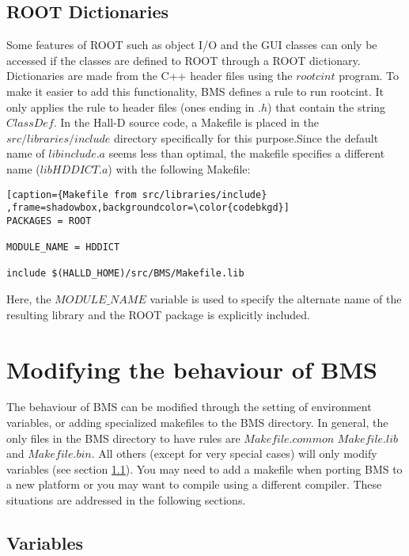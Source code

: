\documentclass[12pt]{article}
\begin{document}
\subsection{ROOT Dictionaries}
Some features of ROOT such as object I/O and the GUI classes can
only be accessed if the classes are defined to ROOT through a ROOT
dictionary. Dictionaries are made from the C++ header files using
the $rootcint$ program. To make it easier to add this functionality,
BMS defines a rule to run rootcint. It only applies the rule to
header files (ones ending in $.h$) that contain the string $ClassDef$.
In the Hall-D source code, a Makefile is placed in the 
$src/libraries/include$ directory specifically for this purpose.Since
the default name of $libinclude.a$ seems less than optimal, the
makefile specifies a different name ($libHDDICT.a$) with the following
Makefile:

\begin{lstlisting}[caption={Makefile from src/libraries/include}
,frame=shadowbox,backgroundcolor=\color{codebkgd}]
PACKAGES = ROOT

MODULE_NAME = HDDICT

include $(HALLD_HOME)/src/BMS/Makefile.lib
\end{lstlisting}

Here, the $MODULE\_NAME$ variable is used to specify the alternate
name of the resulting library and the ROOT package is explicitly
included.

\section{Modifying the behaviour of BMS}
The behaviour of BMS can be modified through the setting of
environment variables, or adding specialized makefiles to the
BMS directory. In general, the only files in the BMS directory
to have rules are $Makefile.common$ $Makefile.lib$ and $Makefile.bin$.
All others (except for very special cases) will only modify
variables (see section \ref{variables}). You may need to add a makefile
when porting BMS to a new platform or you may want to compile
using a different compiler. These situations are addressed in the
following sections.

\subsection{Variables}
\label{variables}
\end{document}
